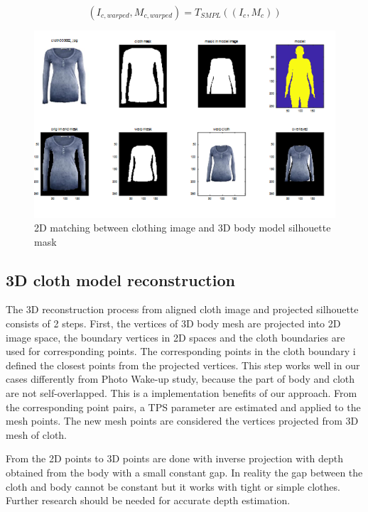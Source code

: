 \begin{equation}
(I_{c, warped}, M_{c, warped})  = T_{SMPL} ((I_c, M_c))
\end{equation}


\begin{figure}[t]
\centering
\includegraphics[scale=0.4]{figures/2dmatching.png}   %
\caption{2D matching between clothing image and 3D body model silhouette mask}
\label{fig:2DmatchingOfClothAndBody}
\end{figure}


\subsection{3D cloth model reconstruction }


The 3D reconstruction process from aligned cloth image and projected silhouette consists of 2 steps. First, the vertices of 3D body mesh are projected into 2D image space, the boundary  vertices in 2D spaces and the cloth boundaries are used for corresponding points. The corresponding points in the cloth boundary i defined the closest points from the projected vertices.  This step works well in our cases differently from Photo Wake-up\cite{Weng2018PhotoW3} study, because the part of body and cloth are not self-overlapped. This is a implementation benefits of our approach. From the corresponding point pairs, a TPS parameter are estimated and applied to the mesh points. The new mesh points are considered the vertices projected from 3D mesh of cloth.    

From the 2D points to 3D points are done with inverse projection with depth obtained from the body with a small constant gap. In reality the gap between the cloth and body cannot be constant but it works with tight or simple clothes. Further research should be needed for accurate depth estimation.   

